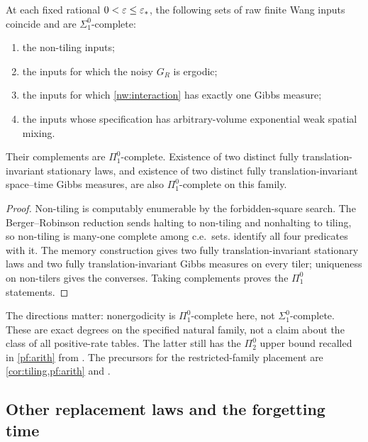 \begin{corollary}\label{nw:complexity}
At each fixed rational $0<\varepsilon\le\varepsilon_*$, the following sets of raw finite Wang inputs coincide and are $\Sigma^0_1$-complete:
\begin{enumerate}[label=\textup{(\roman*)}]
\item the non-tiling inputs;
\item the inputs for which the noisy $G_R$ is ergodic;
\item the inputs for which \eqref{nw:interaction} has exactly one Gibbs measure;
\item the inputs whose specification has arbitrary-volume exponential weak spatial mixing.
\end{enumerate}
Their complements are $\Pi^0_1$-complete. Existence of two distinct fully translation-invariant stationary laws, and existence of two distinct fully translation-invariant space--time Gibbs measures, are also $\Pi^0_1$-complete on this family.
\end{corollary}
\begin{proof}
Non-tiling is computably enumerable by the forbidden-square search. The Berger--Robinson reduction sends halting to non-tiling and nonhalting to tiling, so non-tiling is many-one complete among c.e.\ sets.  identify all four predicates with it. The memory construction gives two fully translation-invariant stationary laws and two fully translation-invariant Gibbs measures on every tiler; uniqueness on non-tilers gives the converses. Taking complements proves the $\Pi^0_1$ statements.
\end{proof}

The directions matter: nonergodicity is $\Pi^0_1$-complete here, not $\Sigma^0_1$-complete. These are exact degrees on the specified natural family, not a claim about the class of all positive-rate tables. The latter still has the $\Pi^0_2$ upper bound recalled in \cref{pf:arith} from \cite[Remark~10.9]{DM26}. The precursors for the restricted-family placement are \cref{cor:tiling,pf:arith} and \cite[Corollary~9.12]{DMdiagram}.

\subsection{Other replacement laws and the forgetting time}

